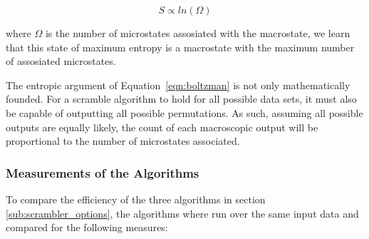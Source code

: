 		\begin{equation}
			S \propto ln(\Omega)
			\label{eqn:boltzman}
		\end{equation}

		where $\Omega$ is the number of microstates assosiated with the macrostate, we learn that this state of maximum entropy is a macrostate with the maximum number of assosiated microstates.
		\par
		The entropic argument of Equation~\ref{eqn:boltzman} is not only mathematically founded. 
		For a scramble algorithm to hold for all possible data sets, it must also be capable of outputting all possible permutations. 
		As such, assuming all possible outputs are equally likely, the count of each macroscopic output will be proportional to the number of microstates associated.

		\subsubsection{Measurements of the Algorithms} 
		\label{subsub:messurements_of_the_algorithms}

			To compare the efficiency of the three algorithms in section \ref{sub:scrambler_options}, the algorithms where run over the same input data and compared for the following measures:

